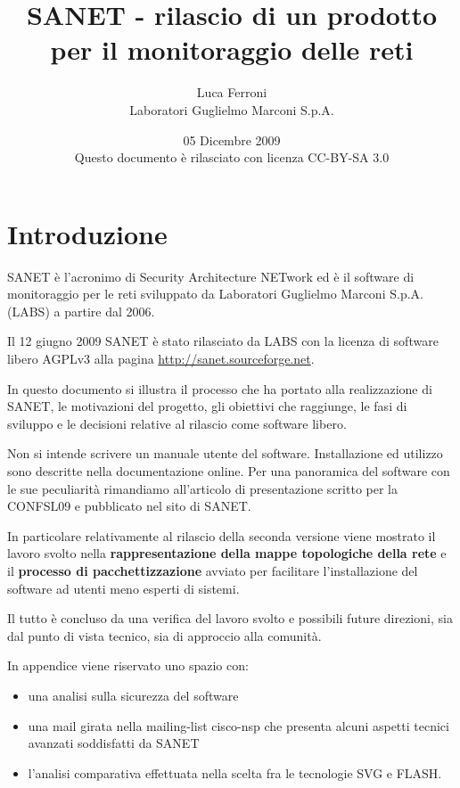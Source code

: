 \documentclass[a4wide,10pt,italian]{manual}
\title{SANET - rilascio di un prodotto per il monitoraggio delle reti}
\date{05 Dicembre 2009 \\ Questo documento è rilasciato con licenza CC-BY-SA 3.0}
\author{Luca Ferroni \\ Laboratori Guglielmo Marconi S.p.A.}
\begin{document}
\maketitle
\tableofcontents


\chapter{Introduzione}

SANET è l'acronimo di Security Architecture NETwork
ed è il software di monitoraggio per le reti sviluppato da
Laboratori Guglielmo Marconi S.p.A. (LABS) a partire dal 2006.

Il 12 giugno 2009 SANET è stato rilasciato da LABS con la licenza di software libero AGPLv3
alla pagina \href{http://sanet.sourceforge.net}{http://sanet.sourceforge.net}.

In questo documento si illustra il processo che ha portato alla
realizzazione di SANET, le motivazioni del progetto, gli obiettivi che raggiunge,
le fasi di sviluppo e le decisioni relative al rilascio come software libero.

Non si intende scrivere un manuale utente del software. Installazione ed utilizzo
sono descritte nella documentazione online. Per una panoramica del software con le sue peculiarità
rimandiamo all'articolo di presentazione scritto per la CONFSL09 e pubblicato nel sito di SANET.

In particolare relativamente al rilascio della seconda versione
viene mostrato il lavoro svolto nella \textbf{rappresentazione della mappe topologiche della rete}
e il \textbf{processo di pacchettizzazione} avviato per facilitare l'installazione del software ad utenti meno
esperti di sistemi.

Il tutto è concluso da una verifica del lavoro svolto e possibili future direzioni,
sia dal punto di vista tecnico, sia di approccio alla comunità.

In appendice viene riservato uno spazio con:
\begin{itemize}
\item {} 
una analisi sulla sicurezza del software

\item {} 
una mail girata nella mailing-list cisco-nsp che presenta alcuni aspetti tecnici avanzati soddisfatti da SANET

\item {} 
l'analisi comparativa effettuata nella scelta fra le tecnologie SVG e FLASH.

\end{itemize}
\end{document}
